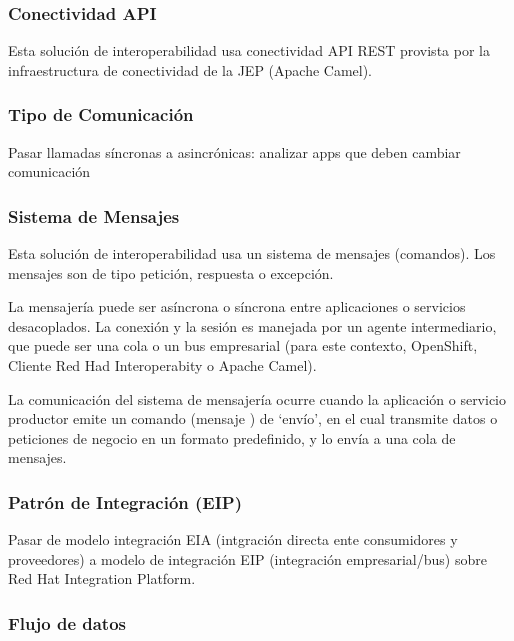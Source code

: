 \documentclass[
  paper=a4,
  ,captions=tableheading
]{scrartcl}
\begin{document}
\subsubsection{Conectividad API}\label{sec:conectividad-api}

Esta solución de interoperabilidad usa conectividad API REST provista
por la infraestructura de conectividad de la JEP (Apache Camel).

\subsubsection{Tipo de Comunicación}\label{sec:tipo-de-comunicaciuxf3n}

Pasar llamadas síncronas a asincrónicas: analizar apps que deben cambiar
comunicación

\subsubsection{Sistema de Mensajes}\label{sec:sistema-de-mensajes}

Esta solución de interoperabilidad usa un sistema de mensajes
(comandos). Los mensajes son de tipo petición, respuesta o excepción.

La mensajería puede ser asíncrona o síncrona entre aplicaciones o
servicios desacoplados. La conexión y la sesión es manejada por un
agente intermediario, que puede ser una cola o un bus empresarial (para
este contexto, OpenShift, Cliente Red Had Interoperabity o Apache
Camel).

La comunicación del sistema de mensajería ocurre cuando la aplicación o
servicio productor emite un comando (mensaje ) de `envío', en el cual
transmite datos o peticiones de negocio en un formato predefinido, y lo
envía a una cola de mensajes.

\subsubsection{Patrón de Integración
(EIP)}\label{sec:patruxf3n-de-integraciuxf3n-eip}

Pasar de modelo integración EIA (intgración directa ente consumidores y
proveedores) a modelo de integración EIP (integración empresarial/bus)
sobre Red Hat Integration Platform.

\subsubsection{Flujo de datos}\label{sec:flujo-de-datos}
\end{document}
